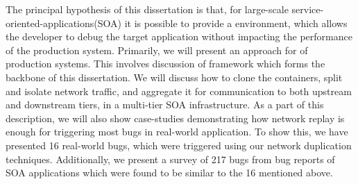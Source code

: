 
The principal hypothesis of this dissertation is that, for large-scale service-oriented-applications(SOA) it is possible to provide a \livedebugging environment, which allows the developer to debug the target application without impacting the performance of the production system.
Primarily, we will present an approach for \livedebugging of production systems.
This involves discussion of \parikshan framework which forms the backbone of this dissertation.
We will discuss how to clone the containers, split and isolate network traffic, and aggregate it for communication to both upstream and downstream tiers, in a multi-tier SOA infrastructure.
As a part of this description, we will also show case-studies demonstrating how network replay is enough for triggering most bugs in real-world application. 
To show this, we have presented 16 real-world bugs, which were triggered using our network duplication techniques. 
Additionally, we present a survey of 217 bugs from bug reports of SOA applications which were found to be similar to the 16 mentioned above.

